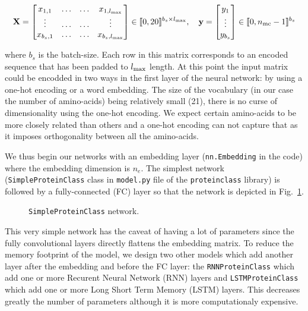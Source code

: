 \documentclass[12pt]{article}
\begin{document}
\begin{equation}
    \vb{X} = \begin{bmatrix}
        x_{1,1} & \ldots & \ldots & x_{1,l_\mathrm{max}} \\
        \vdots & \ldots & \ldots & \vdots \\
        x_{b_s,1} & \ldots & \ldots & x_{b_s,l_\mathrm{max}} \\
    \end{bmatrix} \in \llbracket 0, 20 \rrbracket^{b_s \times l_\mathrm{max}},
    \quad
    \vb{y} = \begin{bmatrix}
        y_1 \\ \vdots \\ y_{b_s}
    \end{bmatrix}
    \in \llbracket 0, n_\mathrm{mc} - 1 \rrbracket^{b_s}
\end{equation}

\noindent where $b_s$ is the batch-size. Each row in this matrix corresponds to an encoded sequence that has been padded to $l_\mathrm{max}$ length. At this point the input matrix could be encodded in two ways in the first layer of the neural network: by using a one-hot encoding or a word embedding. The size of the vocabulary (in our case the number of amino-acids) being relatively small (21), there is no curse of dimensionality using the one-hot encoding. We expect certain amino-acids to be more closely related than others and a one-hot encoding can not capture that as it imposes orthogonality between all the amino-acids.

We thus begin our networks with an embedding layer (\texttt{nn.Embedding} in the code) where the embedding dimension is $n_e$. The simplest network (\texttt{SimpleProteinClass} class in \texttt{model.py} file of the \texttt{proteinclass} library) is followed by a fully-connected (FC) layer so that the network is depicted in Fig.~\ref{fig:simple_network}.

\begin{figure}[htbp]
    \centering
    
    \caption{\texttt{SimpleProteinClass} network.}
    \label{fig:simple_network}
\end{figure}

This very simple network has the caveat of having a lot of parameters since the fully convolutional layers directly flattens the embedding matrix. To reduce the memory footprint of the model, we design two other models which add another layer after the embedding and before the FC layer: the \texttt{RNNProteinClass} which add one or more Recurent Neural Network (RNN) layers and \texttt{LSTMProteinClass} which add one or more Long Short Term Memory (LSTM) layers. This decreases greatly the number of parameters although it is more computationaly expensive.
\end{document}
